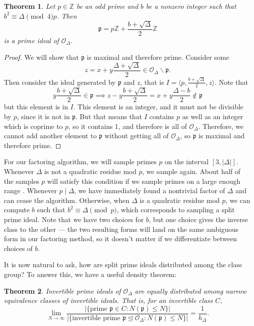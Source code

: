 \documentclass[honours,12pt]{unswthesis}
\newcommand{\Z}{\mathbb{Z}} %
\newcommand{\order}{\mathcal{O}} %
\newcommand{\divides}{\mathrel{|}}
\newtheorem{theorem}{Theorem}[section]
\numberwithin{equation}{section}
\begin{document}
\vspace{2mm}
\begin{theorem}
    Let $p \in \Z$ be an odd prime and $b$ be a nonzero integer such that $b^2 \equiv \Delta \pmod 4p$.
    Then
    $$\mathfrak{p} = p\Z + \frac{b + \sqrt\Delta}{2}\Z$$
    is a prime ideal of $\order_\Delta$.
\end{theorem}

\begin{proof}
    We will show that $\mathfrak{p}$ is maximal and therefore prime.
    Consider some 
    $$z = x + y\frac{\Delta + \sqrt\Delta}{2} \in \order_\Delta \backslash \mathfrak{p}.$$
    Then consider the ideal generated by $\mathfrak{p}$ and $z$, that is $I = \langle p, \frac{b + \sqrt\Delta}{2}, z \rangle$.
    Note that
    $$y\frac{b + \sqrt\Delta}{2} \in \mathfrak{p} \implies z - y\frac{b + \sqrt\Delta}{2} = x + y\frac{\Delta - b}{2} \notin \mathfrak{p}$$
    but this element is in $I$.
    This element is an integer, and it must not be divisible by $p$, since it is not in $\mathfrak{p}$.
    But that means that $I$ contains $p$ as well as an integer which is coprime to $p$, so it contains 1, and therefore is all of $\order_\Delta$.
    Therefore, we cannot add another element to $\mathfrak{p}$ without getting all of $\order_\Delta$, so $\mathfrak{p}$ is maximal and therefore prime.
\end{proof}

For our factoring algorithm, we will sample primes $p$ on the interval $[3, |\Delta|]$.
Whenever $\Delta$ is not a quadratic residue mod $p$, we sample again. 
About half of the samples $p$ will satisfy this condition if we sample primes on a large enough range \cite[Exercise\,11.3.5]{}.
Whenever $p \divides \Delta$, we have immediately found a nontrivial factor of $\Delta$ and can cease the algorithm.
Otherwise, when $\Delta$ is a quadratic residue mod $p$, we can compute $b$ such that $b^2 \equiv \Delta \pmod{p}$, which corresponds to sampling a split prime ideal.
Note that we have two choices for $b$, but one choice gives the inverse class to the other ---
the two resulting forms will land on the same ambiguous form in our factoring method, so it doesn't matter if we differentiate between choices of $b$.

It is now natural to ask, how are split prime ideals distributed among the class group?
To answer this, we have a useful density theorem:

\vspace{2mm}
\begin{theorem}
    Invertible prime ideals of $\order_\Delta$ are equally distributed among narrow equivalence classes of invertible ideals.
    That is, for an invertible class $C$,
    $$\lim_{N \rightarrow \infty} \frac{|\{ \text{prime } \mathfrak{p} \in C : N(\mathfrak{p}) \leq N \}|}{|\{ \text{invertible prime } \mathfrak{p} \trianglelefteq \order_\Delta : N(\mathfrak{p}) \leq N \}|} = \frac{1}{h_\Delta}.$$
\end{theorem}
\vspace{2mm}
\end{document}
